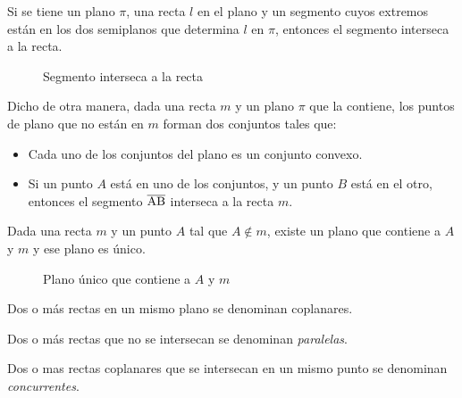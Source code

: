 \begin{postulate}
    Si se tiene un plano $\pi$, una recta $l$ en el plano y un segmento cuyos extremos están en los dos semiplanos que determina $l$ en $\pi$, entonces el segmento interseca a la recta.
    
    \begin{figure}[!h]
        \centering
        
        \caption{Segmento interseca a la recta}
        \label{fig:plot17}
    \end{figure}

    Dicho de otra manera, dada una recta $m$ y un plano $\pi$ que la contiene, los puntos de plano que no están en $m$ forman dos conjuntos tales que:

    \begin{itemize}
        \item Cada uno de los conjuntos del plano es un conjunto convexo.
        \item Si un punto $A$ está en uno de los conjuntos, y un punto $B$ está en el otro, entonces el segmento $\overline{\rm AB}$ interseca a la recta $m$.
    \end{itemize}
    
\end{postulate}

\begin{theorem}
    Dada una recta $m$ y un punto $A$ tal que $A \not \in m$, existe un plano que contiene a $A$ y $m$ y ese plano es único.
 
    \begin{figure}[!h]
        \centering
        
        \caption{Plano único que contiene a $A$ y $m$}
        \label{fig:theorem1}
    \end{figure}
        
\end{theorem}

\begin{definition}
Dos o más rectas en un mismo plano se denominan coplanares.
\end{definition}

\begin{definition}
Dos o más rectas que no se intersecan se denominan \textit{paralelas}.
\end{definition}

\begin{definition}
Dos o mas rectas coplanares que se intersecan en un mismo punto se denominan \textit{concurrentes}.
\end{definition}

